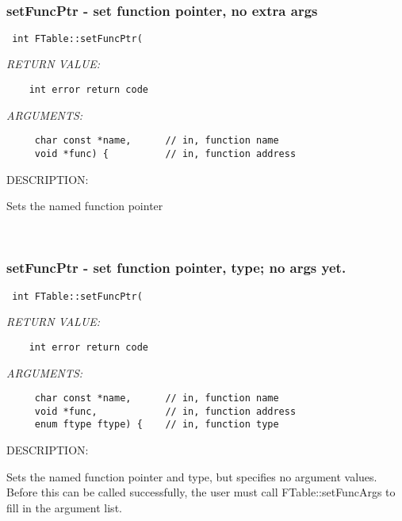  
\mbox{}\hrulefill\
 
\subsubsection [setFuncPtr] {setFuncPtr - set function pointer, no extra args}


  
\begin{verbatim} int FTable::setFuncPtr(\end{verbatim}{\em RETURN VALUE:}
\begin{verbatim}    int error return code\end{verbatim}{\em ARGUMENTS:}
\begin{verbatim}     char const *name,      // in, function name
     void *func) {          // in, function address\end{verbatim}
{\sf DESCRIPTION:\\ }


      Sets the named function pointer
   
 
\mbox{}\hrulefill\
 
\subsubsection [setFuncPtr] {setFuncPtr - set function pointer, type; no args yet.}


  
\begin{verbatim} int FTable::setFuncPtr(\end{verbatim}{\em RETURN VALUE:}
\begin{verbatim}    int error return code\end{verbatim}{\em ARGUMENTS:}
\begin{verbatim}     char const *name,      // in, function name
     void *func,            // in, function address
     enum ftype ftype) {    // in, function type\end{verbatim}
{\sf DESCRIPTION:\\ }


      Sets the named function pointer and type, but specifies no argument
      values.  Before this can be called successfully, the user must call
      FTable::setFuncArgs to fill in the argument list.
   
